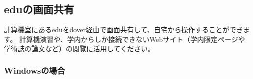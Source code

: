 \documentclass{jarticle}
\begin{document}


\subsection{eduの画面共有}
計算機室にあるeduをdover経由で画面共有して、自宅から操作することができます。
計算機演習や、学内からしか接続できないWebサイト（学内限定ページや学術誌の論文など）の閲覧に活用してください。

\subsubsection{Windowsの場合}
\end{document}

